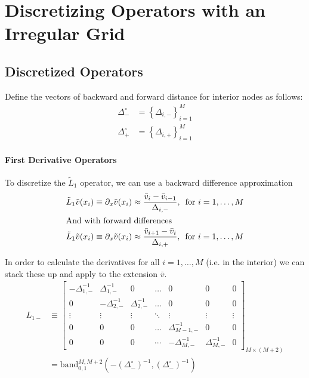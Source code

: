 \documentclass[11pt]{article}
\newcommand{\set}[1]{\ensuremath{\left\{{#1}\right\}}}
\newcommand{\band}{\ensuremath{\mathrm{band}}}
\newcommand{\D}[1][]{\ensuremath{\partial_{#1}}}
\theoremstyle{definition}
\begin{document}
\section{Discretizing Operators with an Irregular Grid}
\subsection{Discretized Operators}

Define the vectors of backward and forward distance for interior nodes as follows:
\begin{align}
\Delta_{-}^\circ &= \set{\Delta_{i,-}}_{i=1}^M \\
\Delta_{+}^\circ &= \set{\Delta_{i,+}}_{i=1}^M
\end{align}

\paragraph{First Derivative Operators}
To discretize the $\tilde{L}_1$ operator, we can use a backward difference approximation
\begin{align}
\tilde{L}_1 \tilde{v}(x_i) &\equiv \D[x] \tilde{v}(x_i) \approx \frac{\bar{v}_i - \bar{v}_{i-1}}{\Delta_{i,-}},\, \text{ for } i = 1,\ldots, M\label{eq:first-order-bd-irregular}\\
\intertext{And with forward differences}
\tilde{L}_1 \tilde{v}(x_i) &\equiv \D[x] \tilde{v}(x_i) \approx \frac{\bar{v}_{i+1} - \bar{v}_i}{\Delta_{i,+}},\, \text{ for } i = 1,\ldots, M\label{eq:first-order-fd-irregular}
\end{align}

In order to calculate the derivatives for all $i = 1, \ldots, M$ (i.e. in the interior) we can stack these up and apply to the extension $\bar{v}$.
\begin{align}\label{eq:L-1-minus-extended}
{L}_{1-} &\equiv\begin{bmatrix}
-\Delta_{1,-}^{-1}&\Delta_{1,-}^{-1}&0&\dots&0&0&0\\
0&-\Delta_{2,-}^{-1}&\Delta_{2,-}^{-1}&\dots&0&0&0\\
\vdots&\vdots&\vdots&\ddots&\vdots&\vdots&\vdots\\
0&0&0&\dots&\Delta_{M-1,-}^{-1}&0&0\\
0&0&0&\cdots&-\Delta_{M,-}^{-1}&\Delta_{M,-}^{-1}&0
\end{bmatrix}_{M\times (M+2)} \\
&= 
\band^{M,M+2}_{0,1}(-(\Delta_-^\circ)^{-1}, (\Delta_-^\circ)^{-1})
\end{align}
\end{document}
